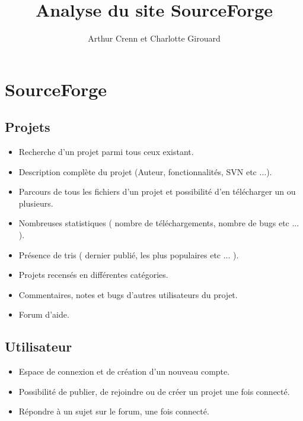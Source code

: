 \documentclass[a4paper,12pt]{article}
\title{Analyse du site SourceForge}
\author{Arthur Crenn et Charlotte Girouard}
\begin{document}
\maketitle

\section{SourceForge}

\vskip5mm

\subsection{Projets}

\begin{itemize}

\item Recherche d'un projet parmi tous ceux existant.
\item Description complète du projet (Auteur, fonctionnalités, SVN etc ...).
\item Parcours de tous les fichiers d'un projet et possibilité d'en télécharger un ou plusieurs.
\item Nombreuses statistiques ( nombre de téléchargements, nombre de bugs etc ... ).
\item Présence de tris ( dernier publié, les plus populaires etc ... ).
\item Projets recensés en différentes catégories.
\item Commentaires, notes et bugs d'autres utilisateurs du projet.
\item Forum d'aide.

\end{itemize}

\vskip5mm

\subsection{Utilisateur}

\begin{itemize}

\item Espace de connexion et de création d'un nouveau compte.
\item Possibilité de publier, de rejoindre ou de créer un projet une fois connecté.
\item Répondre à un sujet sur le forum, une fois connecté.

\end{itemize}
\end{document}
